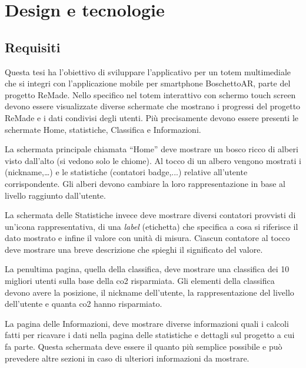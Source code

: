 \chapter{Design e tecnologie}
\section{Requisiti}
Questa tesi ha l'obiettivo di sviluppare l'applicativo per un totem multimediale che si integri con l'applicazione mobile per smartphone BoschettoAR, parte del progetto ReMade.
Nello specifico nel totem interattivo con schermo touch screen devono essere visualizzate diverse schermate che mostrano i progressi del progetto ReMade e i dati condivisi degli utenti.
Più precisamente devono essere presenti le schermate Home, statistiche, Classifica e Informazioni.

La schermata principale chiamata \enquote{Home} deve mostrare un bosco ricco di alberi visto dall'alto (si vedono solo le chiome). Al tocco di un albero vengono mostrati i  (nickname,\dots) e le statistiche (contatori badge,...) relative all'utente corrispondente. Gli alberi devono cambiare la loro rappresentazione in base al livello raggiunto dall'utente.

La schermata delle Statistiche invece deve mostrare diversi contatori provvisti di un'icona rappresentativa, di una \textit{label} (etichetta) che specifica a cosa si riferisce il dato mostrato e infine il valore con unità di misura. Ciascun contatore al tocco deve mostrare una breve descrizione che spieghi il significato del valore.

La penultima pagina, quella della classifica, deve mostrare una classifica dei 10 migliori utenti sulla base della co2 risparmiata.
Gli elementi della classifica devono avere la posizione, il nickname dell'utente, la rappresentazione del livello dell'utente e quanta co2 hanno risparmiato.

La pagina delle Informazioni, deve mostrare diverse informazioni quali i calcoli fatti per ricavare i dati nella pagina delle statistiche e dettagli sul progetto a cui fa parte. Questa schermata deve essere il quanto più semplice possibile e può prevedere altre sezioni in caso di ulteriori informazioni da mostrare.

